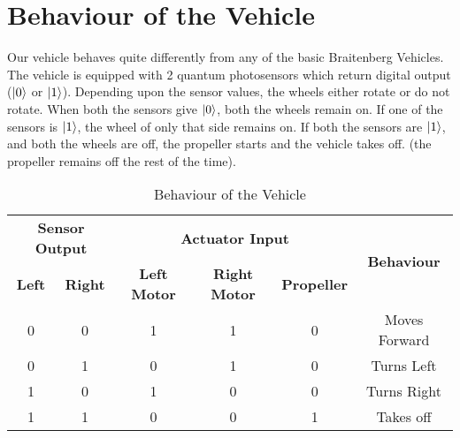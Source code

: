 \section{Behaviour of the Vehicle}

Our vehicle behaves quite differently from any of the basic Braitenberg Vehicles. The vehicle is equipped with 2 quantum photosensors which return digital output ($\ket{0}$ or $\ket{1}$). Depending upon the sensor values, the wheels either rotate or do not rotate. When both the sensors give $\ket{0}$, both the wheels remain on. If one of the sensors is $\ket{1}$, the wheel of only that side remains on. If both the sensors are $\ket{1}$, and both the wheels are off, the propeller starts and the vehicle takes off. (the propeller remains off the rest of the time).


    \begin{table}[t]
        \centering
        \begin{tabular}{|cc|ccc|c|}
            \hline
            \multicolumn{2}{|c|}{\textbf{Sensor Output}}         & \multicolumn{3}{c|}{\textbf{Actuator Input}}                                                              & \multirow{2}{*}{\textbf{Behaviour}} \\ \cline{1-5}
            \multicolumn{1}{|c|}{\textbf{Left}} & \textbf{Right} & \multicolumn{1}{c|}{\textbf{Left Motor}} & \multicolumn{1}{c|}{\textbf{Right Motor}} & \textbf{Propeller} &                                     \\ \hline
            \multicolumn{1}{|c|}{0}             & 0              & \multicolumn{1}{c|}{1}                   & \multicolumn{1}{c|}{1}                    & 0                  & Moves Forward                       \\ \hline
            \multicolumn{1}{|c|}{0}             & 1              & \multicolumn{1}{c|}{0}                   & \multicolumn{1}{c|}{1}                    & 0                  & Turns Left                          \\ \hline
            \multicolumn{1}{|c|}{1}             & 0              & \multicolumn{1}{c|}{1}                   & \multicolumn{1}{c|}{0}                    & 0                  & Turns Right                         \\ \hline
            \multicolumn{1}{|c|}{1}             & 1              & \multicolumn{1}{c|}{0}                   & \multicolumn{1}{c|}{0}                    & 1                  & Takes off                           \\ \hline
        \end{tabular}
        \caption{Behaviour of the Vehicle}
        \label{table:1}
    \end{table}